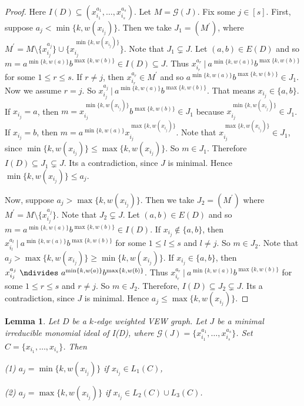 \documentclass[11pt,reqno]{amsart}
\newtheorem{lemma}[theorem]{Lemma}
\theoremstyle{definition}
\begin{document}
\begin{proof}
Here $I(D)  \subseteq   (x^{a_1}_
{i_1} ,\ldots, x^{a_s}_
{i_s})$. Let $M=\mathcal{G}(J)$. Fix some $j \in [s]$. First, suppose $   a_j  < {\min\{k,  w(x_{i_j}) \}}  .$   Then we take $J_1 = (M^{\prime})$, where $M^{\prime} = M \setminus \{x^{a_j}_
{i_j}  \}   \cup  \{x_{i_j}^{\min\{k,w(x_{i_j})\}}   \}$.    Note that $J_1 \subsetneq  J$.  Let $(a,b) \in E(D)$ and so $m = a^{\min\{k,w(a)\}} b^{\max\{k,w(b)\}} \in I(D) \subseteq  J   $.    Thus $  x^{a_r}_
{i_r}  ~|~   a^{\min\{k,w(a)\}} b^{\max\{k,w(b)\}}    $ for some $1 \leq r \leq s$.   If $r \neq j$, then $x^{a_r}_
{i_r} \in M^{\prime} $ and so $    a^{\min\{k,w(a)\}} b^{\max\{k,w(b)\}}  
\in J_1  $.
Now we assume $r = j$.  So $  x^{a_j}_
{i_j}  ~|~   a^{\min\{k,w(a)\}} b^{\max\{k,w(b)\}}    $. That means $  x_
{i_j} \in \{a,b\}$.
If $  x_
{i_j} = a$, then  $m=    x_{i_j}^{\min\{k,w(x_{i_j})\}} b^{\max\{k,w(b)\}}  \in J_1$ because $    x_{i_j}^{\min\{k,w(x_{i_j})\}}   \in J_1$.    If $  x_
{i_j} = b$, then  $m =     a^{\min\{k,w(a)\}} x_{i_j}^{\max\{k,w(x_{i_j})\}}  $.    Note that  $    x_{i_j}^{\max\{k,w(x_{i_j})\}}   \in J_1$, since ${\min\{k,w(x_{i_j})\}} \leq     {\max\{k,w(x_{i_j})\}} $. So  $    m   \in J_1$.  Therefore $ I(D) \subseteq J_1  \subsetneq  J $. Its a contradiction, since $J$ is minimal.  Hence  $    {\min\{k,  w(x_{i_j}) \}}  \leq  a_j.$ \par
Now, suppose $   a_j  > {\max\{k,  w(x_{i_j}) \}}  .$   Then we take $J_2 = (M^{\prime})$ where $M^{\prime} = M \setminus \{x^{a_j}_
{i_j}  \}$.    Note that $J_2 \subsetneq  J$.  Let $(a,b) \in E(D)$ and so $m = a^{\min\{k,w(a)\}} b^{\max\{k,w(b)\}} \in I(D)    $.  If  $ x_{i_j} \notin \{a,b\}$, then $  x^{a_l}_
{i_l}  ~|~   a^{\min\{k,w(a)\}} b^{\max\{k,w(b)\}}    $ for some $1 \leq l \leq s$ and $l \neq j$. So $m \in J_2$.    Note  that    $   a_j  > {\max\{k,  w(x_{i_j}) \}}  \geq {\min\{k,  w(x_{i_j}) \}}$.
If  $ x_{i_j} \in \{a,b\}$, then $  x^{a_j}_
{i_j}  ~\ndivides~   a^{\min\{k,w(a)\}} b^{\max\{k,w(b)\}}    $.
Thus $  x^{a_r}_
{i_r}  ~|~   a^{\min\{k,w(a)\}} b^{\max\{k,w(b)\}}    $ for some $1 \leq r \leq s$ and $r \neq j$. So $m \in J_2$. Therefore, $ I(D) \subseteq J_2  \subsetneq  J $. Its a contradiction, since $J$ is minimal. Hence $   a_j  \leq {\max\{k,  w(x_{i_j}) \}}  .$    
\end{proof}


\begin{lemma}\label{weights}
	Let $ D $ be a $k$-edge weighted VEW graph. Let $ J $ be a minimal irreducible monomial ideal of I(D), where $\mathcal{G}(J) = \{x^{a_1}_
	{i_1} ,\ldots, x^{a_s}_
	{i_s}\}$. Set $C =  \{x_{i_1} ,\ldots, x_{i_s}\}
	$.  Then 
	
	(1)  $a_j = {\min\{k,  w(x_{i_j}) \}}$   if $  x_{i_j} \in  L_1(C) $, 
	
	(2) $a_j =      {\max\{k, w(x_{i_j})\}}$ if $x_{i_j} \in  L_2(C) \cup L_3(C)  $.	
	
\end{lemma}
\end{document}
